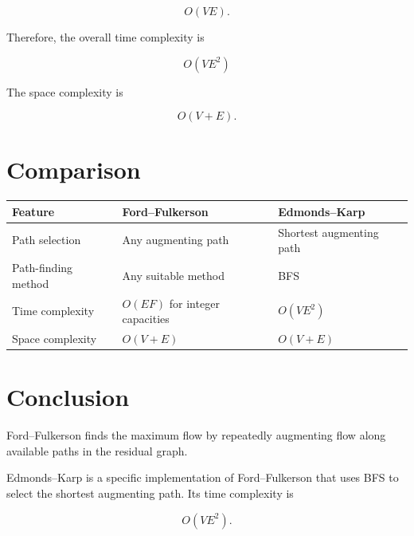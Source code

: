 \documentclass[12pt,a4paper]{article}
\begin{document}
\[
O(VE).
\]

Therefore, the overall time complexity is

\[
\boxed{O(VE^2)}
\]

The space complexity is

\[
\boxed{O(V+E)}.
\]

\section{Comparison}

\begin{center}
\begin{tabular}{>{\raggedright\arraybackslash}p{4cm}
                >{\raggedright\arraybackslash}p{5cm}
                >{\raggedright\arraybackslash}p{5cm}}
\toprule
\textbf{Feature} & \textbf{Ford--Fulkerson} & \textbf{Edmonds--Karp} \\
\midrule
Path selection & Any augmenting path & Shortest augmenting path \\
Path-finding method & Any suitable method & BFS \\
Time complexity & $O(EF)$ for integer capacities & $O(VE^2)$ \\
Space complexity & $O(V+E)$ & $O(V+E)$ \\
\bottomrule
\end{tabular}
\end{center}

\section{Conclusion}

Ford--Fulkerson finds the maximum flow by repeatedly augmenting flow
along available paths in the residual graph.

Edmonds--Karp is a specific implementation of Ford--Fulkerson that uses
BFS to select the shortest augmenting path. Its time complexity is

\[
\boxed{O(VE^2)}.
\]
\end{document}
